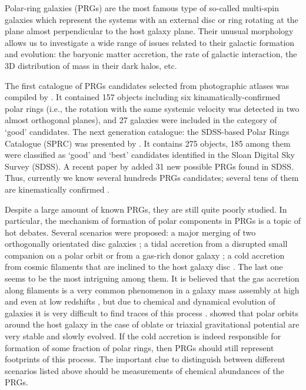 \documentclass[useAMS,usenatbib]{mnras}
\begin{document}
Polar-ring galaxies (PRGs) are the most famous type of so-called multi-spin galaxies \citep[the term was introduced by][]{Rubin1994} which represent the systems with an external disc or ring rotating at the plane almost perpendicular to the host galaxy plane. Their unusual morphology allows us to investigate a wide range of issues related to their galactic formation and evolution: the baryonic matter accretion, the rate of galactic interaction, the 3D distribution of mass in their dark halos, etc.     

The first catalogue of PRGs candidates selected from photographic atlases was compiled by \citet{Whitmore1990}. It contained 157 objects including six kinamatically-confirmed polar rings (i.e., the rotation with the same systemic velocity was detected in two almost orthogonal planes), and 27 galaxies were included in the category of `good' candidates. The next generation catalogue: the SDSS-based Polar Rings Catalogue (SPRC) was presented by \citet{sprc}. It contains 275 objects, 185 among  them were classified as `good' and `best' candidates identified in the Sloan Digital Sky Survey (SDSS). A recent paper by \citet{Reshetnikov2019} { added 31 new possible  PRGs} found in SDSS. Thus, currently we know several hundreds PRGs candidates; several tens of them are kinematically confirmed \citep*[see details and references in ][]{Reshetnikov2004,sprc}.

Despite a large amount of known PRGs, they are still quite poorly studied. In particular, the mechanism of formation of polar components in PRGs is a topic of hot debates. Several scenarios were proposed: a major merging  of two orthogonally orientated disc galaxies \citep{Bekki1997, Bournaud2003}; a tidal accretion from a disrupted small companion on a polar orbit or from a gas-rich donor galaxy \citep{Schweizer1983, Reshetnikov1997}; a cold accretion from   cosmic filaments that are inclined to the host galaxy disc \citep{Maccio2006}. The last one seems to be the most intriguing among them. It is believed that the gas accretion along filaments is a very common phenomenon in a galaxy mass assembly at high and even at low redshifts \citep{Dekel2009}, but due to chemical and dynamical evolution of galaxies it is very difficult to find traces of this process \citep[see][for review]{SanchezAlmeida2014}. \citet{Steiman1982} showed that polar orbits around the host galaxy in the case of oblate or triaxial gravitational potential are very stable and slowly evolved.  If the cold accretion is indeed responsible for formation of some fraction of  polar rings, then PRGs should still represent  footprints of this process. The important clue to distinguish between different scenarios listed above should be measurements of chemical abundances of the PRGs.
\end{document}
